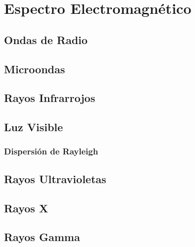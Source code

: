 \chapter{Espectro Electromagnético}\label{lbl-espectroElectromagnetico}

\section{Ondas de Radio}

\section{Microondas}

\section{Rayos Infrarrojos}

\section{Luz Visible}

\subsection{Dispersión de Rayleigh}

\section{Rayos Ultravioletas}

\section{Rayos X}

\section{Rayos Gamma}

